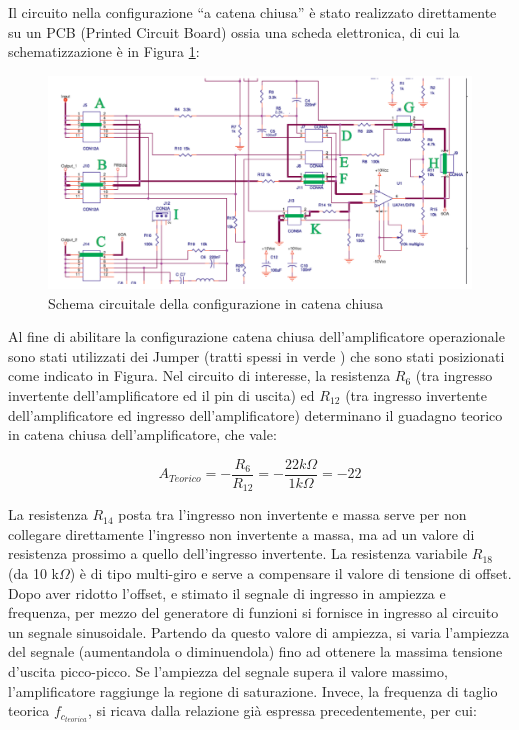 Il circuito nella configurazione “a catena chiusa” è stato realizzato direttamente su un PCB (Printed Circuit Board) ossia una scheda elettronica, di cui la schematizzazione è in Figura \ref{fig:schemaCatenaChiusa}:
\begin{figure}[h]
    \centering
    \includegraphics[width=1\linewidth]{media/schemaCircuitaleuA741.png}
    \caption{Schema circuitale della configurazione in catena chiusa}
    \label{fig:schemaCatenaChiusa}
\end{figure}
\FloatBarrier
Al fine di abilitare la configurazione catena chiusa dell'amplificatore operazionale sono stati utilizzati dei Jumper (tratti spessi in verde ) che sono stati posizionati come indicato in Figura.
\FloatBarrier
Nel circuito di interesse, la resistenza \(R_6\) (tra ingresso invertente dell’amplificatore ed il pin di uscita) ed \(R_{12}\) (tra ingresso invertente dell’amplificatore ed ingresso dell’amplificatore) determinano il guadagno teorico in catena chiusa dell’amplificatore, che vale:

\[A_{Teorico}=-\frac{R_6}{R_{12}}=-\frac{22 k\Omega}{1 k\Omega}=-22\]

La resistenza \(R_{14}\) posta tra l’ingresso non invertente e massa serve per non collegare direttamente l’ingresso non invertente a massa, ma ad un valore di resistenza prossimo a quello dell’ingresso invertente. La resistenza variabile \(R_{18}\) (da 10 k\(\Omega\)) è di tipo multi-giro e serve a compensare il valore di tensione di offset. Dopo aver ridotto l’offset, e stimato il segnale di ingresso in ampiezza e frequenza, per mezzo del generatore di funzioni si fornisce in ingresso al circuito un segnale sinusoidale. Partendo da questo valore di ampiezza, si varia l’ampiezza del segnale (aumentandola o diminuendola) fino ad ottenere la massima tensione d’uscita picco-picco. Se l’ampiezza del segnale supera il valore massimo, l’amplificatore raggiunge la regione di saturazione.
Invece, la frequenza di taglio teorica \(f_{c_{teorica}}\), si ricava dalla relazione già espressa precedentemente, per cui:

